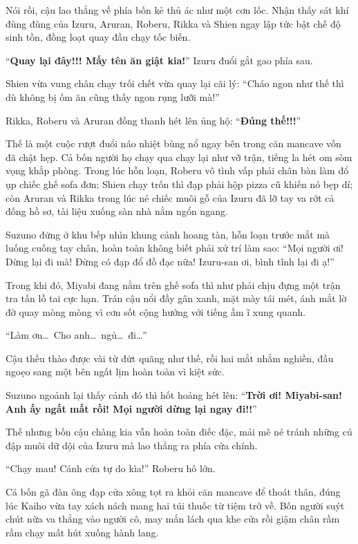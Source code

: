 \documentclass[../main.tex]{subfiles}
\begin{document}
Nói rồi, cậu lao thẳng về phía bốn kẻ thủ ác như một cơn lốc. Nhận thấy sát khí đùng đùng của Izuru, Aruran, Roberu, Rikka và Shien ngay lập tức bật chế độ sinh tồn, đồng loạt quay đầu chạy tốc biến.

``\textbf{Quay lại đây!!! Mấy tên ăn giật kia!}'' Izuru đuổi gắt gao phía sau.

Shien vừa vung chân chạy trối chết vừa quay lại cãi lý: ``Cháo ngon như thế thì dù không bị ốm ăn cũng thấy ngon rụng lưỡi mà!''

Rikka, Roberu và Aruran đồng thanh hét lên ủng hộ: ``\textbf{Đúng thế!!!}''

Thế là một cuộc rượt đuổi náo nhiệt bùng nổ ngay bên trong căn mancave vốn đã chật hẹp. Cả bốn người họ chạy qua chạy lại như vỡ trận, tiếng la hét om sòm vọng khắp phòng. Trong lúc hỗn loạn, Roberu vô tình vấp phải chân bàn làm đổ ụp chiếc ghế sofa đơn; Shien chạy trốn thì đạp phải hộp pizza cũ khiến nó bẹp dí; còn Aruran và Rikka trong lúc né chiếc muôi gỗ của Izuru đã lỡ tay va rớt cả đống hồ sơ, tài liệu xuống sàn nhà nằm ngổn ngang.


Suzuno đứng ở khu bếp nhìn khung cảnh hoang tàn, hỗn loạn trước mắt mà luống cuống tay chân, hoàn toàn không biết phải xử trí làm sao: ``Mọi người ơi! Dừng lại đi mà! Đừng có đạp đổ đồ đạc nữa! Izuru-san ơi, bình tĩnh lại đi ạ!''

Trong khi đó, Miyabi đang nằm trên ghế sofa thì như phải chịu đựng một trận tra tấn lỗ tai cực hạn. Trán cậu nổi đầy gân xanh, mặt mày tái mét, ánh mắt lờ đờ quay mòng mòng vì cơn sốt cộng hưởng với tiếng ầm ĩ xung quanh.

``Làm ơn\dots\ Cho anh\dots\ ngủ\dots\ đi\dots''

Cậu thều thào được vài từ đứt quãng như thế, rồi hai mắt nhắm nghiền, đầu ngoẹo sang một bên ngất lịm hoàn toàn vì kiệt sức.

Suzuno ngoảnh lại thấy cảnh đó thì hốt hoảng hét lên: ``\textbf{Trời ơi! Miyabi-san! Anh ấy ngất mất rồi! Mọi người dừng lại ngay đi!!}''

Thế nhưng bốn cậu chàng kia vẫn hoàn toàn điếc đặc, mải mê né tránh những cú đập muôi dữ dội của Izuru mà lao thẳng ra phía cửa chính.

``Chạy mau! Cánh cửa tự do kìa!'' Roberu hô lớn.

Cả bốn gã đàn ông đạp cửa xông tọt ra khỏi căn mancave để thoát thân, đúng lúc Kaiho vừa tay xách nách mang hai túi thuốc từ tiệm trở về. Bốn người suýt chút nữa va thẳng vào người cô, may mắn lách qua khe cửa rồi giậm chân rầm rầm chạy mất hút xuống hành lang.
\end{document}
